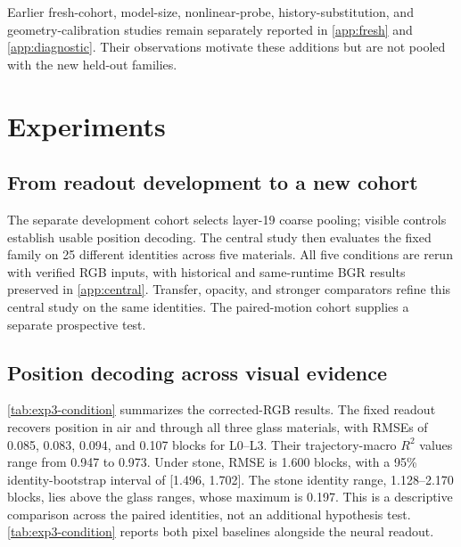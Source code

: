 \documentclass{article}
\begin{document}
Earlier fresh-cohort, model-size, nonlinear-probe, history-substitution, and geometry-calibration studies remain separately reported in \autoref{app:fresh} and \autoref{app:diagnostic}. Their observations motivate these additions but are not pooled with the new held-out families.

\section{Experiments}
\label{sec:experiments}
\subsection{From readout development to a new cohort}
The separate development cohort selects layer-19 coarse pooling; visible controls establish usable position decoding. The central study then evaluates the fixed family on 25 different identities across five materials. All five conditions are rerun with verified RGB inputs, with historical and same-runtime BGR results preserved in \autoref{app:central}. Transfer, opacity, and stronger comparators refine this central study on the same identities. The paired-motion cohort supplies a separate prospective test.

\subsection{Position decoding across visual evidence}
\label{sec:graded-results}
\autoref{tab:exp3-condition} summarizes the corrected-RGB results. The fixed readout recovers position in air and through all three glass materials, with RMSEs of 0.085, 0.083, 0.094, and 0.107 blocks for L0--L3. Their trajectory-macro $R^2$ values range from 0.947 to 0.973. Under stone, RMSE is 1.600 blocks, with a 95\% identity-bootstrap interval of [1.496, 1.702]. The stone identity range, 1.128--2.170 blocks, lies above the glass ranges, whose maximum is 0.197. This is a descriptive comparison across the paired identities, not an additional hypothesis test. \autoref{tab:exp3-condition} reports both pixel baselines alongside the neural readout.
\end{document}
